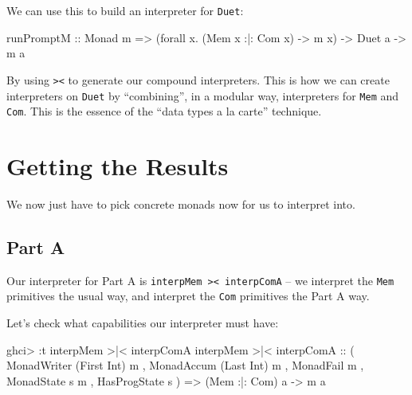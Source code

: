 \documentclass[]{article}
\newenvironment{Shaded}{}{}
\newcommand{\DataTypeTok}[1]{\textcolor[rgb]{0.56,0.13,0.00}{#1}}
\newcommand{\FunctionTok}[1]{\textcolor[rgb]{0.02,0.16,0.49}{#1}}
\newcommand{\NormalTok}[1]{#1}
\newcommand{\OtherTok}[1]{\textcolor[rgb]{0.00,0.44,0.13}{#1}}
\begin{document}
We can use this to build an interpreter for \texttt{Duet}:

\begin{Shaded}
\begin{Highlighting}[]
\NormalTok{runPromptM}
\OtherTok{    ::} \DataTypeTok{Monad}\NormalTok{ m}
    \OtherTok{=>}\NormalTok{ (forall x}\FunctionTok{.}\NormalTok{ (}\DataTypeTok{Mem}\NormalTok{ x }\FunctionTok{:|:} \DataTypeTok{Com}\NormalTok{ x) }\OtherTok{->}\NormalTok{ m x)}
    \OtherTok{->} \DataTypeTok{Duet}\NormalTok{ a}
    \OtherTok{->}\NormalTok{ m a}
\end{Highlighting}
\end{Shaded}

By using \texttt{\textgreater{}\textbar{}\textless{}} to generate our compound
interpreters. This is how we can create interpreters on \texttt{Duet} by
``combining'', in a modular way, interpreters for \texttt{Mem} and \texttt{Com}.
This is the essence of the ``data types a la carte'' technique.

\hypertarget{getting-the-results}{%
\section{Getting the Results}\label{getting-the-results}}

We now just have to pick concrete monads now for us to interpret into.

\hypertarget{part-a}{%
\subsection{Part A}\label{part-a}}

Our interpreter for Part A is
\texttt{interpMem\ \textgreater{}\textbar{}\textless{}\ interpComA} -- we
interpret the \texttt{Mem} primitives the usual way, and interpret the
\texttt{Com} primitives the Part A way.

Let's check what capabilities our interpreter must have:

\begin{Shaded}
\begin{Highlighting}[]
\NormalTok{ghci}\FunctionTok{>} \FunctionTok{:}\NormalTok{t interpMem }\FunctionTok{>|<}\NormalTok{ interpComA}
\NormalTok{interpMem }\FunctionTok{>|<}\NormalTok{ interpComA}
\OtherTok{    ::}\NormalTok{ ( }\DataTypeTok{MonadWriter}\NormalTok{ (}\DataTypeTok{First} \DataTypeTok{Int}\NormalTok{) m}
\NormalTok{       , }\DataTypeTok{MonadAccum}\NormalTok{ (}\DataTypeTok{Last} \DataTypeTok{Int}\NormalTok{) m}
\NormalTok{       , }\DataTypeTok{MonadFail}\NormalTok{ m}
\NormalTok{       , }\DataTypeTok{MonadState}\NormalTok{ s m}
\NormalTok{       , }\DataTypeTok{HasProgState}\NormalTok{ s}
\NormalTok{       )}
    \OtherTok{=>}\NormalTok{ (}\DataTypeTok{Mem} \FunctionTok{:|:} \DataTypeTok{Com}\NormalTok{) a}
    \OtherTok{->}\NormalTok{ m a}
\end{Highlighting}
\end{Shaded}
\end{document}
